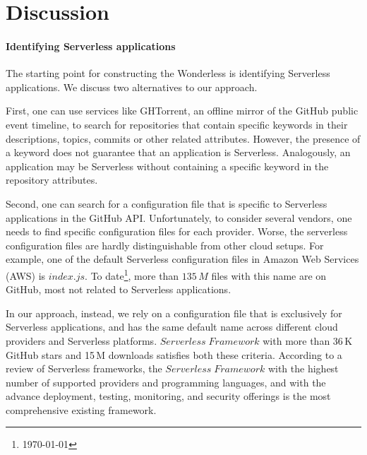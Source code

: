 
\section{Discussion}
\label{discussion}

\paragraph{Identifying Serverless applications}
The starting point for constructing the Wonderless is identifying Serverless 
applications. We discuss two alternatives to our approach.

First, one can use services like GHTorrent\cite{gousios2012ghtorrent}, 
an offline mirror of the GitHub public event timeline, to search for repositories 
that contain specific keywords in their descriptions, topics, commits or other 
related attributes. However, the presence of a keyword does not guarantee 
that an application is Serverless. Analogously, an application may be Serverless 
without containing a specific keyword in the repository attributes.

Second, one can search for a configuration file that is 
specific to Serverless applications in the GitHub API. Unfortunately, to consider several vendors, 
one needs to find specific configuration files for each provider.
Worse, the serverless configuration files are hardly distinguishable from other cloud setups. 
For example, one of the default Serverless configuration files in Amazon 
Web Services\,(AWS) is $index.js$. To date\footnote{\today}, 
more than $135 \, M$ files with this name are on GitHub, most not 
related to Serverless applications. 

In our approach, instead, we rely on a configuration file that is exclusively 
for Serverless applications, and has the same default name across 
different cloud providers and Serverless platforms. 
$Serverless \; Framework$ with more than 36\,K GitHub stars and 15\,M 
downloads satisfies both these criteria. According to a review of Serverless 
frameworks\cite{kritikos2018review}, the $Serverless \; Framework$ 
with the highest number of supported providers 
and programming languages, and with the advance deployment, testing, 
monitoring, and security offerings is the most comprehensive existing framework. 


